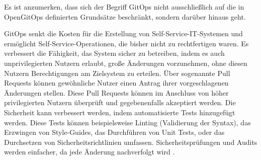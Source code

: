 Es ist anzumerken, dass sich der Begriff GitOps nicht ausschließlich auf
die in OpenGitOps definierten Grundsätze beschränkt,
sondern darüber hinaus geht.
\bigskip

GitOps senkt die Kosten für die Erstellung von Self-Service-IT-Systemen und ermöglicht Self-Service-Operationen, die bisher nicht zu rechtfertigen waren.
Es verbessert die Fähigkeit, das System sicher zu betreiben, indem es auch
unprivilegierten Nutzern erlaubt, große Änderungen vorzunehmen,
ohne diesen Nutzern Berechtigungen am Zielsystem zu erteilen.
Über sogenannte Pull Requests können gewöhnliche Nutzer einen Antrag
ihrer vorgeschlagenen Änderungen stellen.
Diese Pull Requests können im Anschluss von höher privilegierten Nutzern
überprüft und gegebenenfalls akzeptiert werden.
Die Sicherheit kann verbessert werden, 
indem automatisierte Tests hinzugefügt werden.
Diese Tests können beispielsweise
Linting (Validierung der Syntax),
das Erzwingen von Style-Guides,
das Durchführen von Unit Tests,
oder
das Durchsetzen von Sicherheitsrichtlinien
umfassen.
Sicherheitsprüfungen und Audits werden einfacher, 
da jede Änderung nachverfolgt wird
\autocite{limoncelli_gitopsPathToMoreSelfService}.















